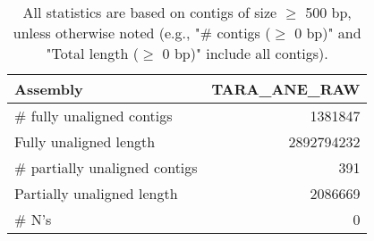\documentclass[12pt,a4paper]{article}
\begin{document}
\begin{table}[ht]
\begin{center}
\caption{All statistics are based on contigs of size $\geq$ 500 bp, unless otherwise noted (e.g., "\# contigs ($\geq$ 0 bp)" and "Total length ($\geq$ 0 bp)" include all contigs).}
\begin{tabular}{|l*{1}{|r}|}
\hline
Assembly & TARA\_ANE\_RAW \\ \hline
\# fully unaligned contigs & 1381847 \\ \hline
Fully unaligned length & 2892794232 \\ \hline
\# partially unaligned contigs & 391 \\ \hline
Partially unaligned length & 2086669 \\ \hline
\# N's & 0 \\ \hline
\end{tabular}
\end{center}
\end{table}
\end{document}
